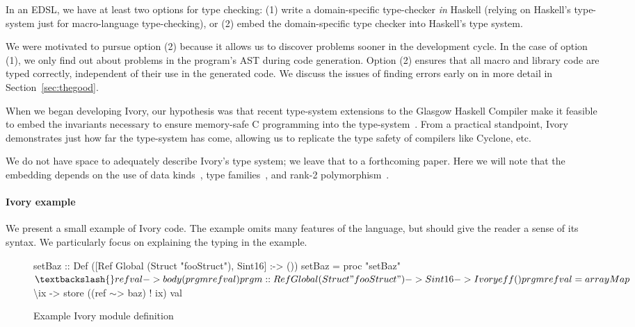 In an EDSL, we have at least two options for type checking: (1) write a
domain-specific type-checker \emph{in} Haskell (relying on Haskell's type-system
just for macro-language type-checking), or (2) embed the domain-specific type
checker into Haskell's type system.

We were motivated to pursue option (2) because it allows us to discover problems
sooner in the development cycle. In the case of option (1), we only find out
about problems in the program's AST during code generation. Option (2) ensures
that all macro and library code are typed correctly, independent of their use in
the generated code. We discuss the issues of finding errors early on in more
detail in Section~\ref{sec:thegood}.

When we began developing Ivory, our hypothesis  was that recent type-system
extensions to the Glasgow Haskell Compiler make it feasible to embed the
invariants necessary to ensure memory-safe C programming into the
type-system~\cite{dephaskell}. From a practical standpoint, Ivory demonstrates
just how far the type-system has come, allowing us to replicate the type safety
of compilers like Cyclone, etc.

We do not have space to adequately describe Ivory's type system; we leave that
to a forthcoming paper.  Here we will note that the embedding depends on the use
of data kinds~\cite{datakinds}, type families~\cite{typefamilies}, and rank-2
polymorphism~\cite{stmonad}.


\paragraph{Ivory example}
We present a small example of Ivory code.  The example omits many features of
the language, but should give the reader a sense of its syntax.  We particularly
focus on explaining the typing in the example.

\begin{figure}
    \begin{smcode}

setBaz :: Def ([Ref Global (Struct "fooStruct"), Sint16] :-> ())
setBaz = proc "setBaz" $ \textbackslash{}ref val -> body (prgm ref val)

prgm :: Ref Global (Struct "fooStruct") -> Sint16 -> Ivory eff ()
prgm ref val = arrayMap $ \textbackslash{}ix ->
                 store ((ref \(\sim\)> baz) ! ix) val
    \end{smcode}
  \caption{Example Ivory module definition}
  \label{fig:module}
\end{figure}

